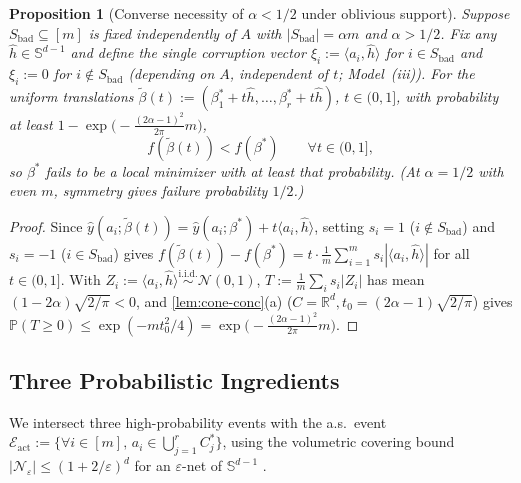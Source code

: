 \documentclass[11pt]{article}
\theoremstyle{plain}
\newtheorem{proposition}[theorem]{Proposition}
\theoremstyle{remark}
\numberwithin{equation}{section}
\newcommand{\R}{\mathbb{R}}
\newcommand{\Prob}{\mathbb{P}}
\newcommand{\Sph}{\mathbb{S}}
\newcommand{\ip}[2]{\langle #1, #2 \rangle}
\begin{document}
\begin{proposition}[Converse necessity of $\alpha < 1/2$ under oblivious support]
  \label{prop:converse}
  Suppose $S_{\mathrm{bad}} \subseteq [m]$ is fixed independently of $A$ with $|S_{\mathrm{bad}}| = \alpha m$ and $\alpha > 1/2$. Fix any $\hat h \in \Sph^{d-1}$ and define the single corruption vector $\xi_i := \ip{a_i}{\hat h}$ for $i \in S_{\mathrm{bad}}$ and $\xi_i := 0$ for $i \notin S_{\mathrm{bad}}$ (depending on $A$, independent of $t$; Model~(iii)). For the uniform translations $\tilde\beta(t) := (\beta_1^* + t\hat h, \dots, \beta_r^* + t\hat h)$, $t \in (0, 1]$, with probability at least $1 - \exp\bigl(-\frac{(2\alpha - 1)^2}{2\pi} m\bigr)$,
  \[
    f(\tilde\beta(t)) < f(\beta^*) \qquad \forall t \in (0, 1],
  \]
  so $\beta^*$ fails to be a local minimizer with at least that probability. (At $\alpha = 1/2$ with even $m$, symmetry gives failure probability $1/2$.)
\end{proposition}
\begin{proof}
Since $\hat y(a_i; \tilde\beta(t)) = \hat y(a_i; \beta^*) + t\ip{a_i}{\hat h}$, setting $s_i = 1$ ($i \notin S_{\mathrm{bad}}$) and $s_i = -1$ ($i \in S_{\mathrm{bad}}$) gives $f(\tilde\beta(t)) - f(\beta^*) = t\cdot \frac{1}{m}\sum_{i=1}^m s_i|\ip{a_i}{\hat h}|$ for all $t \in (0, 1]$. With $Z_i := \ip{a_i}{\hat h} \stackrel{\mathrm{i.i.d.}}{\sim} \mathcal{N}(0, 1)$, $T := \frac{1}{m}\sum_i s_i|Z_i|$ has mean $(1 - 2\alpha)\sqrt{2/\pi} < 0$, and \cref{lem:cone-conc}(a) ($C = \R^d, t_0 = (2\alpha - 1)\sqrt{2/\pi}$) gives $\Prob(T \ge 0) \le \exp(-m t_0^2/4) = \exp\bigl(-\frac{(2\alpha - 1)^2}{2\pi} m\bigr)$.
\end{proof}

\subsection{Three Probabilistic Ingredients}

We intersect three high-probability events with the a.s.\ event $\mathcal{E}_{\mathrm{act}} := \{\forall i \in [m],\, a_i \in \bigcup_{j=1}^r C_j^*\}$, using the volumetric covering bound $|\mathcal{N}_\varepsilon| \le (1 + 2/\varepsilon)^d$ for an $\varepsilon$-net of $\Sph^{d-1}$ \cite[Corollary~4.2.13]{vershynin2018high}.
\end{document}
